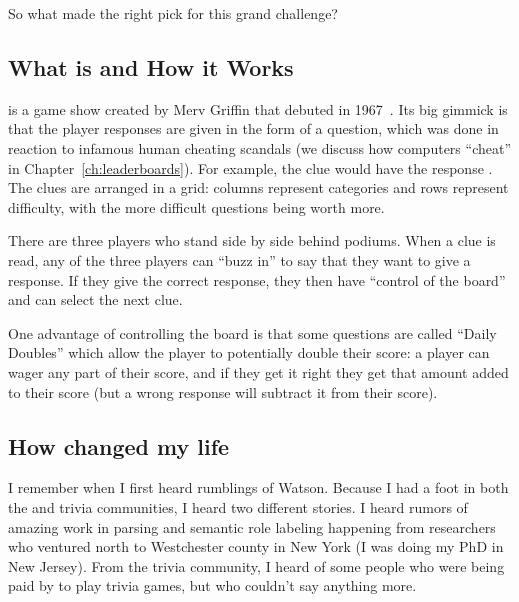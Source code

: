 So what made \jeopardy{} the right pick for this grand challenge?


\subsection{What \jeopardy{} is and How it Works}

\jeopardy{} is a game show created by Merv Griffin that debuted in
1967~\citep{griffin-03}.
%
Its big gimmick is that the player responses are given in the form of
a question, which was done in reaction to infamous human cheating scandals (we discuss how
computers ``cheat'' in Chapter~\ref{ch:leaderboards}).
%
For example, the clue
would have the response .
%
%
The clues are arranged in a grid: columns represent categories and
rows represent difficulty, with the more difficult questions being
worth more.

There are three players who stand side by side behind podiums.
%
When a clue is read, any of the three players can ``buzz in'' to say
that they want to give a response.
%
If they give the correct response, they then have ``control of the
board'' and can select the next clue.

One advantage of controlling the board is that some questions are
called ``Daily Doubles'' which allow the player to potentially double
their score: a player can wager any part of their score, and if they
get it right they get that amount added to their score (but a wrong
response will subtract it from their score).

\subsection{How \watson{} changed my life}

I remember when I first heard rumblings of Watson.
%
Because I had a foot in both the  and trivia communities, I
heard two different stories.
%
I heard rumors of amazing work in parsing and semantic role labeling
happening from researchers who ventured north to Westchester county in New
York (I was doing my PhD in New Jersey).
%
From the trivia community, I heard of some people who were being paid
by  to play trivia games, but who couldn't say anything
more.

